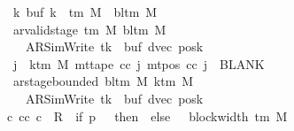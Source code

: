 \begin{isabellebody}
\ \ \ \ \ \ \ \ \ \ \ \ \ {\isasymforall}k{\isachardot}{\kern0pt}\ buf\ k\ {\isasymin}\ {\isasymGamma}{\isacharunderscore}{\kern0pt}tm\ M\ {\isasymunion}\ {\isacharbraceleft}{\kern0pt}bl{\isacharunderscore}{\kern0pt}tm\ M{\isacharbraceright}{\kern0pt}{\isacharsemicolon}{\kern0pt}\isanewline
\ \ \ \ \ \ \ \ \ \ \ \ \ ar{\isacharunderscore}{\kern0pt}valid{\isacharunderscore}{\kern0pt}stage\ {\isacharparenleft}{\kern0pt}{\isasymGamma}{\isacharunderscore}{\kern0pt}tm\ M{\isacharparenright}{\kern0pt}\ {\isacharparenleft}{\kern0pt}bl{\isacharunderscore}{\kern0pt}tm\ M{\isacharparenright}{\kern0pt}\isanewline
\ \ \ \ \ \ \ \ \ \ \ \ \ \ \ {\isacharparenleft}{\kern0pt}AR{\isacharunderscore}{\kern0pt}SimWrite{\isacharcomma}{\kern0pt}\ tk{\isacharprime}{\kern0pt}{\isacharcomma}{\kern0pt}\ {}{\isacharcomma}{\kern0pt}\ buf{\isacharcomma}{\kern0pt}\ dvec{\isacharcomma}{\kern0pt}\ posk{\isacharparenright}{\kern0pt}{\isacharsemicolon}{\kern0pt}\isanewline
\ \ \ \ \ \ \ \ \ \ \ \ \ {\isasymforall}j\ {\isasymge}\ k{\isacharunderscore}{\kern0pt}tm\ M{\isachardot}{\kern0pt}\ mt{\isacharunderscore}{\kern0pt}tape\ cc\ j\ {\isacharparenleft}{\kern0pt}mt{\isacharunderscore}{\kern0pt}pos\ cc\ j{\isacharparenright}{\kern0pt}\ {\isacharequal}{\kern0pt}\ BLANK{}{\isacharsemicolon}{\kern0pt}\isanewline
\ \ \ \ \ \ \ \ \ \ \ \ \ ar{\isacharunderscore}{\kern0pt}stage{\isacharunderscore}{\kern0pt}bounded\ {\isacharparenleft}{\kern0pt}bl{\isacharunderscore}{\kern0pt}tm\ M{\isacharparenright}{\kern0pt}\ {\isacharparenleft}{\kern0pt}k{\isacharunderscore}{\kern0pt}tm\ M{\isacharparenright}{\kern0pt}\isanewline
\ \ \ \ \ \ \ \ \ \ \ \ \ \ \ {\isacharparenleft}{\kern0pt}AR{\isacharunderscore}{\kern0pt}SimWrite{\isacharcomma}{\kern0pt}\ tk{\isacharprime}{\kern0pt}{\isacharcomma}{\kern0pt}\ {}{\isacharcomma}{\kern0pt}\ buf{\isacharcomma}{\kern0pt}\ dvec{\isacharcomma}{\kern0pt}\ posk{\isacharparenright}{\kern0pt}\ {\isasymrbrakk}\isanewline
\ \ \ \ \ \ \ \ \ \ \ {\isasymLongrightarrow}\ {\isasymexists}c{\isacharprime}{\kern0pt}{\isacharprime}{\kern0pt}{\isachardot}{\kern0pt}\ {\isacharparenleft}{\kern0pt}cc{\isacharcomma}{\kern0pt}\ c{\isacharprime}{\kern0pt}{\isacharprime}{\kern0pt}{\isacharparenright}{\kern0pt}\ {\isasymin}\ R{\isacharprime}{\kern0pt}\ {\isacharcircum}{\kern0pt}{\isacharcircum}{\kern0pt}\ {\isacharparenleft}{\kern0pt}if\ p{\isacharprime}{\kern0pt}\ {\isacharequal}{\kern0pt}\ {}\ then\ {}\ else\ {}\ {\isacharasterisk}{\kern0pt}\ block{\isacharunderscore}{\kern0pt}width\ {\isacharparenleft}{\kern0pt}{\isasymGamma}{\isacharunderscore}{\kern0pt}tm\ M{\isacharparenright}{\kern0pt}{\isacharparenright}{\kern0pt}\isanewline

\end{isabellebody}
